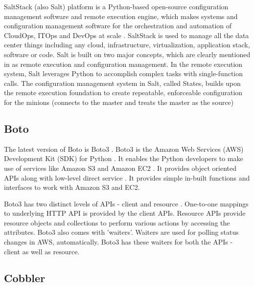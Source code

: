      SaltStack (also Salt) platform is a Python-based open-source
     configuration management software and remote execution engine,
     which makes systems and configuration management software for the
     orchestration and automation of CloudOps, ITOps and DevOps at
     scale \cite{www-saltstack}. SaltStack is used to manage all the
     data center things including any cloud, infrastructure,
     virtualization, application stack, software or code. Salt is
     built on two major concepts, which are clearly mentioned in
     \cite{SaltStack-book} as remote execution and configuration
     management. In the remote execution system, Salt leverages Python
     to accomplish complex tasks with single-function calls. The
     configuration management system in Salt, called States, builds
     upon the remote execution foundation to create repeatable,
     enforceable configuration for the minions (connects to the master
     and treats the master as the source)
     
\subsection{Boto}

     The latest version of Boto is Boto3 \cite{www-boto}.
     Boto3 is the Amazon Web Services (AWS) Development Kit (SDK) for
     Python \cite{www-boto-github}. It enables the
     Python developers to make use of services like Amazon S3
     and Amazon EC2 \cite{www-boto-amazon-python-sdk}.  It provides
     object oriented APIs along with low-level direct service 
     \cite{www-boto3-documentation}.  It provides simple in-built functions 
     and interfaces to work with Amazon S3 and EC2.

     Boto3 has two distinct levels of APIs - client and resource 
     \cite{www-boto-amazon-python-sdk}. One-to-one mappings to underlying 
     HTTP API is provided by the client APIs. Resource APIs provide resource
     objects and collections to perform various actions by accessing
     the attributes.  Boto3 also comes with 'waiters'. Waiters are
     used for polling status changes in AWS, automatically. Boto3 has
     these waiters for both the APIs
     - client as well as resource. 
     
\subsection{Cobbler}

